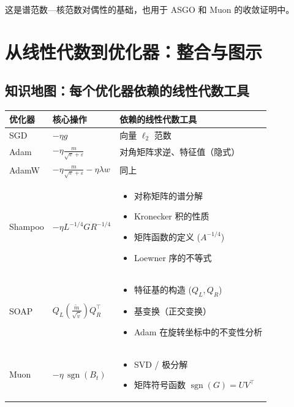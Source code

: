 \documentclass[12pt,a4paper]{ctexart}
\theoremstyle{definition}
\theoremstyle{plain}
\newcommand{\eps}{\varepsilon}
\DeclareMathOperator{\sgn}{sgn}
\begin{document}
这是谱范数—核范数对偶性的基础，也用于 ASGO 和 Muon 的收敛证明中。

\section{从线性代数到优化器：整合与图示}

\subsection{知识地图：每个优化器依赖的线性代数工具}

\begin{center}
\begin{tabular}{lll}
\toprule
\textbf{优化器} & \textbf{核心操作} & \textbf{依赖的线性代数工具} \\
\midrule
SGD & $-\eta g$ & 向量 $\ell_2$ 范数 \\
Adam & $-\eta \frac{m}{\sqrt{v}+\eps}$ & 对角矩阵求逆、特征值（隐式） \\
AdamW & $-\eta\frac{m}{\sqrt{v}+\eps} - \eta\lambda w$ & 同上 \\
Shampoo & $-\eta L^{-1/4}GR^{-1/4}$ &
  \parbox{6cm}{\vspace{-0.3cm}\begin{itemize}
    \item 对称矩阵的谱分解
    \item Kronecker 积的性质
    \item 矩阵函数的定义 ($A^{-1/4}$)
    \item Loewner 序的不等式
  \end{itemize}} \\
SOAP & $Q_L(\frac{\tilde m}{\sqrt{\tilde v}})Q_R^\top$ &
  \parbox{6cm}{\vspace{-0.3cm}\begin{itemize}
    \item 特征基的构造 ($Q_L,Q_R$)
    \item 基变换（正交变换）
    \item Adam 在旋转坐标中的不变性分析
  \end{itemize}} \\
Muon & $-\eta\,\sgn(B_t)$ &
  \parbox{6cm}{\vspace{-0.3cm}\begin{itemize}
    \item SVD / 极分解
    \item 矩阵符号函数 $\sgn(G)=UV^\top$

\end{itemize}}
\end{tabular}
\end{center}
\end{document}
